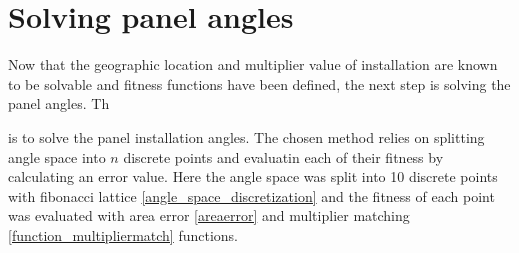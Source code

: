 

\newpage
\section{Solving panel angles}
Now that the geographic location and multiplier value of installation are known to be solvable and fitness functions have been defined, the next step is solving the panel angles. Th


is to solve the panel installation angles. The chosen method relies on splitting angle space into $n$ discrete points and evaluatin each of their fitness by calculating an error value. Here the angle space was split into 10 discrete points with fibonacci lattice \ref{angle_space_discretization} and the fitness of each point was evaluated with area error \ref{areaerror} and multiplier matching \ref{function_multipliermatch} functions. %



